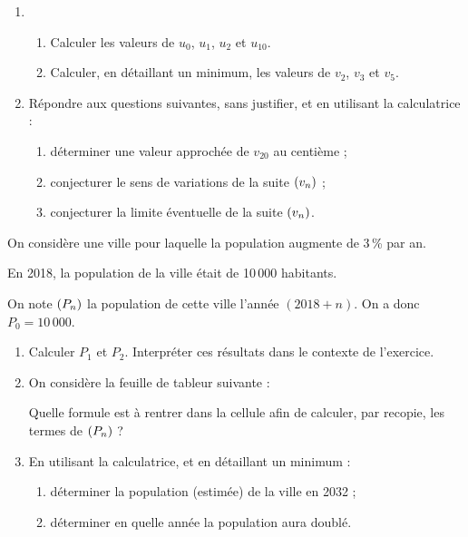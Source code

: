 \documentclass[a4paper,11pt]{article}
\begin{document}
\begin{enumerate}
	\item 
	\begin{enumerate}
		\item Calculer les valeurs de $u_0$, $u_1$, $u_2$ et $u_{10}$.
		\item Calculer, en détaillant un minimum, les valeurs de $v_2$, $v_3$ et $v_{5}$.
	\end{enumerate}
	\item Répondre aux questions suivantes, sans justifier, et en utilisant la calculatrice :
	\begin{enumerate}
		\item déterminer une valeur approchée de $v_{20}$ au centième ;
		\item conjecturer le sens de variations de la suite $\suiten[v]$ ;
		\item conjecturer la limite éventuelle de la suite $\suiten[v]$.
	\end{enumerate}
\end{enumerate}

\medskip


\medskip

On considère une ville pour laquelle la population augmente de 3\,\% par an.

\smallskip

En 2018, la population de la ville était de 10\,000 habitants.

\smallskip

On note $\suiten[P]$ la population de cette ville l'année $(2018+n)$. On a donc $P_0=10\,000$.

\begin{enumerate}
	\item Calculer $P_1$ et $P_2$. Interpréter ces résultats dans le contexte de l'exercice.
	\item On considère la feuille de tableur suivante :
	
	\begin{center}
	\end{center}
	Quelle formule est à rentrer dans la cellule  afin de calculer, par recopie, les termes de $\suiten[P]$ ?
	\item En utilisant la calculatrice, et en détaillant un minimum :
	\begin{enumerate}
		\item déterminer la population (estimée) de la ville en 2032 ;
		\item déterminer en quelle année la population aura doublé.
	\end{enumerate}
\end{enumerate}
\end{document}
